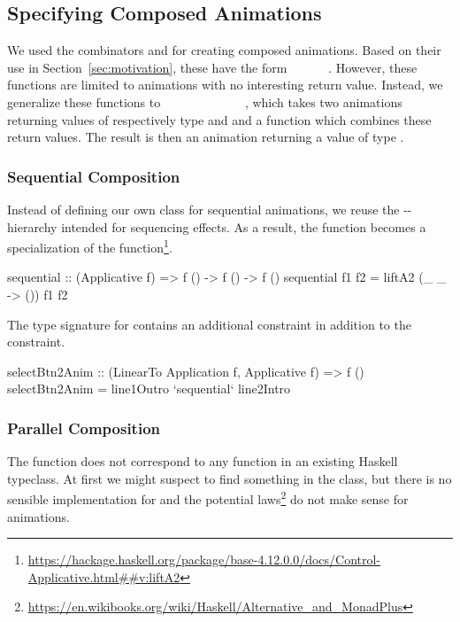 \subsection{Specifying Composed Animations}

We used the combinators  and  for creating composed animations. Based on their use in Section~\ref{sec:motivation}, these have the form ~\hs{()}~\hs{->}~~\hs{->}~~\hs{()}. However, these functions are limited to animations with no interesting return value. Instead, we generalize these functions to \hs{(}~\hs{->}~~\hs{->}~\hs{)}~\hs{->}~~~\hs{->}~~~\hs{->}~~, which takes two animations returning values of respectively type  and  and a function which combines these return values. The result is then an animation returning a value of type .

\subsubsection{Sequential Composition}

Instead of defining our own class for sequential animations, we reuse the -- hierarchy intended for sequencing effects. As a result, the  function becomes a specialization of the  function\footnote{\url{https://hackage.haskell.org/package/base-4.12.0.0/docs/Control-Applicative.html##v:liftA2}}.

\begin{code}
sequential :: (Applicative f) => f () -> f () -> f ()
sequential f1 f2 = liftA2 (\_ _ -> ()) f1 f2
\end{code}

The type signature for  contains an additional  constraint in addition to the  constraint.

\begin{code}
selectBtn2Anim :: (LinearTo Application f, Applicative f) => f ()
selectBtn2Anim = line1Outro `sequential` line2Intro
\end{code}

\subsubsection{Parallel Composition}

The  function does not correspond to any function in an existing Haskell typeclass. At first we might suspect to find something in the  class, but there is no sensible implementation for  and the potential laws\footnote{\url{https://en.wikibooks.org/wiki/Haskell/Alternative_and_MonadPlus}} do not make sense for animations.

